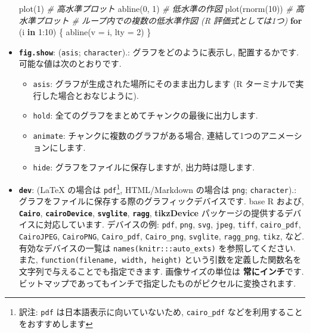 \documentclass[
  11pt,
  lualatex,
  ja=standard]{bxjsreport}
\newenvironment{Shaded}{\begin{snugshade}}{\end{snugshade}}
\newcommand{\AttributeTok}[1]{\textcolor[rgb]{0.77,0.63,0.00}{#1}}
\newcommand{\CommentTok}[1]{\textcolor[rgb]{0.56,0.35,0.01}{\textit{#1}}}
\newcommand{\ControlFlowTok}[1]{\textcolor[rgb]{0.13,0.29,0.53}{\textbf{#1}}}
\newcommand{\DecValTok}[1]{\textcolor[rgb]{0.00,0.00,0.81}{#1}}
\newcommand{\FunctionTok}[1]{\textcolor[rgb]{0.00,0.00,0.00}{#1}}
\newcommand{\NormalTok}[1]{#1}
\newcommand{\SpecialCharTok}[1]{\textcolor[rgb]{0.00,0.00,0.00}{#1}}
\providecommand{\tightlist}{%
  \setlength{\itemsep}{0pt}\setlength{\parskip}{0pt}}
\begin{document}
\begin{itemize}
\begin{Shaded}
\begin{Highlighting}[numbers=left,,]
\FunctionTok{plot}\NormalTok{(}\DecValTok{1}\NormalTok{)  }\CommentTok{\# 高水準プロット}
\FunctionTok{abline}\NormalTok{(}\DecValTok{0}\NormalTok{, }\DecValTok{1}\NormalTok{)  }\CommentTok{\# 低水準の作図}
\FunctionTok{plot}\NormalTok{(}\FunctionTok{rnorm}\NormalTok{(}\DecValTok{10}\NormalTok{))  }\CommentTok{\# 高水準プロット}
\CommentTok{\# ループ内での複数の低水準作図 (R 評価式としては1つ)}
\ControlFlowTok{for}\NormalTok{ (i }\ControlFlowTok{in} \DecValTok{1}\SpecialCharTok{:}\DecValTok{10}\NormalTok{) \{}
  \FunctionTok{abline}\NormalTok{(}\AttributeTok{v =}\NormalTok{ i, }\AttributeTok{lty =} \DecValTok{2}\NormalTok{)}
\NormalTok{\}}
\end{Highlighting}
\end{Shaded}
\item
  \textbf{\texttt{fig.show}}: (\texttt{\textquotesingle{}asis\textquotesingle{}}; \texttt{character}).: グラフをどのように表示し, 配置するかです. 可能な値は次のとおりです.

  \begin{itemize}
  \tightlist
  \item
    \texttt{asis}: グラフが生成された場所にそのまま出力します (R ターミナルで実行した場合とおなじように).
  \item
    \texttt{hold}: 全てのグラフをまとめてチャンクの最後に出力します.
  \item
    \texttt{animate}: チャンクに複数のグラフがある場合, 連結して1つのアニメーションにします.
  \item
    \texttt{hide}: グラフをファイルに保存しますが, 出力時は隠します.
  \end{itemize}
\item
  \textbf{\texttt{dev}}: (LaTeX の場合は \texttt{\textquotesingle{}pdf\textquotesingle{}}\footnote{訳注: \texttt{pdf} は日本語表示に向いていないため, \texttt{cairo\_pdf} などを利用することをおすすめします}, HTML/Markdown の場合は \texttt{\textquotesingle{}png\textquotesingle{}}; \texttt{character}).: グラフをファイルに保存する際のグラフィックデバイスです. base R および, \textbf{\texttt{Cairo}}, \textbf{\texttt{cairoDevice}}, \textbf{\texttt{svglite}}, \textbf{\texttt{ragg}}, \textbf{tikzDevice} パッケージの提供するデバイスに対応しています. デバイスの例: \texttt{pdf}, \texttt{png}, \texttt{svg}, \texttt{jpeg}, \texttt{tiff}, \texttt{cairo\_pdf}, \texttt{CairoJPEG}, \texttt{CairoPNG}, \texttt{Cairo\_pdf}, \texttt{Cairo\_png}, \texttt{svglite}, \texttt{ragg\_png}, \texttt{tikz}, など. 有効なデバイスの一覧は \texttt{names(knitr:::auto\_exts)} を参照してください. また, \texttt{function(filename, width, height)} という引数を定義した関数名を文字列で与えることでも指定できます. 画像サイズの単位は \textbf{常にインチ}です. ビットマップであってもインチで指定したものがピクセルに変換されます.
\end{itemize}
\end{document}
